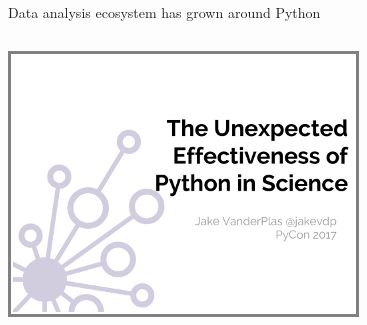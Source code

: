 \documentclass[aspectratio=169]{beamer}
\begin{document}
\begin{frame}{Data analysis ecosystem has grown around Python}
\begin{columns}[b]

\includegraphics[width=\linewidth]{unreasonable-effectiveness.png}
\vspace{5.3 cm}
\end{columns}
\end{frame}
\end{document}
